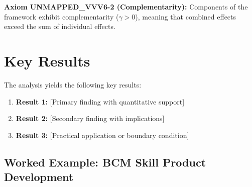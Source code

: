 \begin{tcolorbox}[colback=yellow!5!white,colframe=yellow!75!black,title=Axiom UNMAPPED_VVV6-2: Complementarity]
\textbf{Axiom UNMAPPED_VVV6-2 (Complementarity):}
Components of the framework exhibit complementarity ($\gamma > 0$), meaning
that combined effects exceed the sum of individual effects.
\end{tcolorbox}


\section{Key Results}
\label{sec:vvv6-results}

The analysis yields the following key results:

\begin{enumerate}
    \item \textbf{Result 1:} [Primary finding with quantitative support]
    \item \textbf{Result 2:} [Secondary finding with implications]
    \item \textbf{Result 3:} [Practical application or boundary condition]
\end{enumerate}


\subsection{Worked Example: BCM Skill Product Development}
\label{sec:vvv-worked-example}

